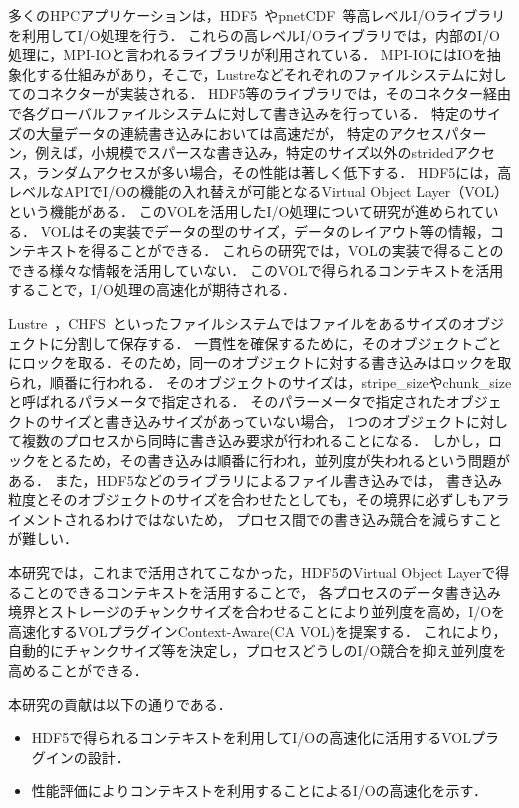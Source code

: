\documentclass[submit,techrep,noauthor]{ipsj}
\begin{document}
多くのHPCアプリケーションは，HDF5~\cite{hdf5}やpnetCDF~\cite{pnetcdf}等高レベルI/Oライブラリを利用してI/O処理を行う\cite{byna2020exahdf5}．
これらの高レベルI/Oライブラリでは，内部のI/O処理に，MPI-IOと言われるライブラリが利用されている．
MPI-IOにはIOを抽象化する仕組みがあり，そこで，Lustreなどそれぞれのファイルシステムに対してのコネクターが実装される．
HDF5等のライブラリでは，そのコネクター経由で各グローバルファイルシステムに対して書き込みを行っている．
特定のサイズの大量データの連続書き込みにおいては高速だが，
特定のアクセスパターン，例えば，小規模でスパースな書き込み，特定のサイズ以外のstridedアクセス，ランダムアクセスが多い場合，その性能は著しく低下する．
HDF5には，高レベルなAPIでI/Oの機能の入れ替えが可能となるVirtual Object Layer（VOL）という機能がある．
このVOLを活用したI/O処理について研究が進められている\cite{zheng2022hdf5,tang2021transparent,soumagne2021accelerating}．
VOLはその実装でデータの型のサイズ，データのレイアウト等の情報，コンテキストを得ることができる．
これらの研究では，VOLの実装で得ることのできる様々な情報を活用していない．
このVOLで得られるコンテキストを活用することで，I/O処理の高速化が期待される．

Lustre~\cite{Lustre}，CHFS~\cite{tatebe2022chfs}といったファイルシステムではファイルをあるサイズのオブジェクトに分割して保存する．
一貫性を確保するために，そのオブジェクトごとにロックを取る．そのため，同一のオブジェクトに対する書き込みはロックを取られ，順番に行われる．
そのオブジェクトのサイズは，stripe\_sizeやchunk\_sizeと呼ばれるパラメータで指定される．
そのパラーメータで指定されたオブジェクトのサイズと書き込みサイズがあっていない場合，
1つのオブジェクトに対して複数のプロセスから同時に書き込み要求が行われることになる．
しかし，ロックをとるため，その書き込みは順番に行われ，並列度が失われるという問題がある．
また，HDF5などのライブラリによるファイル書き込みでは，
書き込み粒度とそのオブジェクトのサイズを合わせたとしても，その境界に必ずしもアライメントされるわけではないため，
プロセス間での書き込み競合を減らすことが難しい．

本研究では，これまで活用されてこなかった，HDF5のVirtual Object Layerで得ることのできるコンテキストを活用することで，
各プロセスのデータ書き込み境界とストレージのチャンクサイズを合わせることにより並列度を高め，I/Oを高速化するVOLプラグインContext-Aware(CA VOL)を提案する．
これにより，自動的にチャンクサイズ等を決定し，プロセスどうしのI/O競合を抑え並列度を高めることができる．

本研究の貢献は以下の通りである．
\begin{itemize}
	\item HDF5で得られるコンテキストを利用してI/Oの高速化に活用するVOLプラグインの設計．
	\item 性能評価によりコンテキストを利用することによるI/Oの高速化を示す．
\end{itemize}
\end{document}
